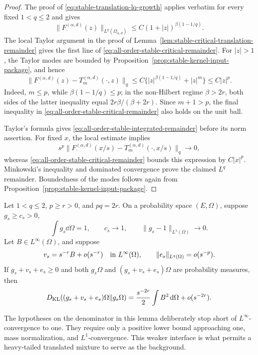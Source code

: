 \begin{proof}
The proof of \eqref{eq:stable-translation-lq-growth} applies verbatim for
every fixed \(1<q\le2\) and gives
\[
 \|F_\cdot^{(\alpha,d)}(z)\|_{L^q(\Omega_{\alpha,d})}
 \le C(1+|z|)^{\beta(1-1/q)}.
\]
The local Taylor argument in the proof of
Lemma~\ref{lem:stable-critical-translation-remainder} gives the first line
of \eqref{eq:all-order-stable-critical-remainder}.  For \(|z|>1\), the
Taylor modes are bounded by
Proposition~\ref{prop:stable-kernel-input-package}, and
hence
\[
 \|F_\cdot^{(\alpha,d)}(z)-T_m^{(\alpha,d)}(\cdot,z)\|_q
 \le C\{|z|^{\beta(1-1/q)}+|z|^m\}\le C|z|^p.
\]
Indeed, \(m\le p\), while
\(\beta(1-1/q)\le p\); in the non-Hilbert regime
\(\beta>2r\), both sides of the latter inequality equal
\(2r\beta/(\beta+2r)\).  Since \(m+1>p\), the final inequality in
\eqref{eq:all-order-stable-critical-remainder} also holds on the unit ball.

Taylor's formula gives \eqref{eq:all-order-stable-integrated-remainder}
before its norm assertion.  For fixed \(x\), the local estimate implies
\[
 s^p\|F_\cdot^{(\alpha,d)}(x/s)
       -T_m^{(\alpha,d)}(\cdot,x/s)\|_q\longrightarrow0,
\]
whereas \eqref{eq:all-order-stable-critical-remainder} bounds this expression
by \(C|x|^p\).  Minkowski's inequality and dominated convergence prove the
claimed \(L^q\) remainder.  Boundedness of the modes follows again from
Proposition~\ref{prop:stable-kernel-input-package}.
\end{proof}

\begin{lemma}
\label{lem:two-background-critical-bregman-transfer}
Let \(1<q\le2\), \(p\ge r>0\), and \(pq=2r\).  On a probability space
\((E,\Omega)\), suppose \(g_s\ge c_s>0\),
\[
 \int g_s\dd\Omega=1,\qquad c_s\longrightarrow1,
 \qquad \|g_s-1\|_{L^1(\Omega)}\longrightarrow0.
\]
Let \(B\in L^\infty(\Omega)\), and suppose
\[
 v_s=s^{-r}B+o(s^{-r})\quad\hbox{in }L^\infty(\Omega),
 \qquad \|e_s\|_{L^q(\Omega)}=o(s^{-p}).
\]
If \(g_s+v_s+e_s\ge0\) and both \(g_s\Omega\) and
\((g_s+v_s+e_s)\Omega\) are probability measures, then
\begin{equation}\label{eq:two-background-critical-bregman-transfer}
 D_{\rm KL}((g_s+v_s+e_s)\Omega\|g_s\Omega)
 =\frac{s^{-2r}}2\int B^2\,\mathrm{d}\Omega+o(s^{-2r}).
\end{equation}
\end{lemma}

The hypotheses on the denominator in this lemma deliberately stop short of
\(L^\infty\)-convergence to one.  They require only a positive lower bound
approaching one, mass normalization, and \(L^1\)-convergence.  This weaker
interface is what permits a heavy-tailed translated mixture to serve as the
background.

